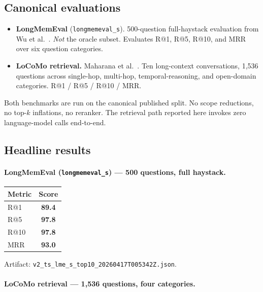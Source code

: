 \documentclass{article}
\begin{document}
\subsection{Canonical evaluations}

\begin{itemize}
  \item \textbf{LongMemEval} (\texttt{longmemeval\_s}). 500-question
        full-haystack evaluation from Wu et al.~\cite{wu2024longmemeval}.
        \emph{Not} the oracle subset. Evaluates R@1, R@5, R@10, and MRR
        over six question categories.
  \item \textbf{LoCoMo retrieval.} Maharana et
        al.~\cite{maharana2024locomo}. Ten long-context conversations,
        1{,}536 questions across single-hop, multi-hop,
        temporal-reasoning, and open-domain categories. R@1 / R@5 /
        R@10 / MRR.
\end{itemize}

Both benchmarks are run on the canonical published split. No scope
reductions, no top-$k$ inflations, no reranker. The retrieval path
reported here invokes zero language-model calls end-to-end.

\subsection{Headline results}

\paragraph{LongMemEval (\texttt{longmemeval\_s}) --- 500 questions, full haystack.}

\begin{center}
\begin{tabular}{lc}
\toprule
Metric & Score \\
\midrule
R@1  & \textbf{89.4} \\
R@5  & \textbf{97.8} \\
R@10 & \textbf{97.8} \\
MRR  & \textbf{93.0} \\
\bottomrule
\end{tabular}
\end{center}

Artifact: \texttt{v2\_ts\_lme\_s\_top10\_20260417T005342Z.json}.

\paragraph{LoCoMo retrieval --- 1{,}536 questions, four categories.}
\end{document}
